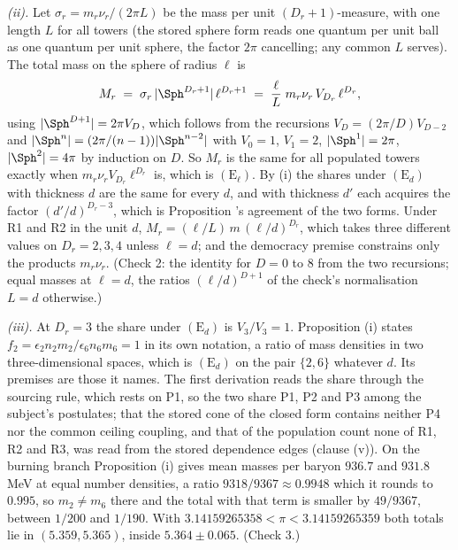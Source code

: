 \emph{(ii).} Let $\sigma_{r} = m_{r}\nu_{r}/(2\pi L)$ be the mass per unit $(D_{r}+1)$-measure, with one length $L$ for all towers (the stored sphere form reads one quantum per unit ball as one quantum per unit sphere, the factor $2\pi$ cancelling; any common $L$ serves). The total mass on the sphere of radius $\ell$ is
\[
M_{r} \;=\; \sigma_{r}\,|\Sph^{D_{r}+1}|\,\ell^{D_{r}+1} \;=\; \frac{\ell}{L}\; m_{r}\nu_{r}\,V_{D_{r}}\,\ell^{D_{r}},
\]
using $|\Sph^{D+1}| = 2\pi V_{D}$, which follows from the recursions $V_{D} = (2\pi/D)V_{D-2}$ and $|\Sph^{n}| = (2\pi/(n-1))|\Sph^{n-2}|$ with $V_{0} = 1$, $V_{1} = 2$, $|\Sph^{1}| = 2\pi$, $|\Sph^{2}| = 4\pi$ by induction on $D$. So $M_{r}$ is the same for all populated towers exactly when $m_{r}\nu_{r}V_{D_{r}}\ell^{D_{r}}$ is, which is $(\mathrm{E}_{\ell})$. By (i) the shares under $(\mathrm{E}_{d})$ with thickness $d$ are the same for every $d$, and with thickness $d'$ each acquires the factor $(d'/d)^{D_{r}-3}$, which is Proposition 's agreement of the two forms. Under R1 and R2 in the unit $d$, $M_{r} = (\ell/L)\,m\,(\ell/d)^{D_{r}}$, which takes three different values on $D_{r} = 2, 3, 4$ unless $\ell = d$; and the democracy premise constrains only the products $m_{r}\nu_{r}$. (Check 2: the identity for $D = 0$ to $8$ from the two recursions; equal masses at $\ell = d$, the ratios $(\ell/d)^{D+1}$ of the check's normalisation $L = d$ otherwise.)

\emph{(iii).} At $D_{r} = 3$ the share under $(\mathrm{E}_{d})$ is $V_{3}/V_{3} = 1$. Proposition (i) states $f_{2} = \epsilon_{2}n_{2}m_{2}/\epsilon_{6}n_{6}m_{6} = 1$ in its own notation, a ratio of mass densities in two three-dimensional spaces, which is $(\mathrm{E}_{d})$ on the pair $\{2, 6\}$ whatever $d$. Its premises are those it names. The first derivation reads the share through the sourcing rule, which rests on P1, so the two share P1, P2 and P3 among the subject's postulates; that the stored cone of the closed form contains neither P4 nor the common ceiling coupling, and that of the population count none of R1, R2 and R3, was read from the stored dependence edges (clause (v)). On the burning branch Proposition (i) gives mean masses per baryon $936.7$ and $931.8$ MeV at equal number densities, a ratio $9318/9367 \approx 0.9948$ which it rounds to $0.995$, so $m_{2} \neq m_{6}$ there and the total with that term is smaller by $49/9367$, between $1/200$ and $1/190$. With $3.14159265358 < \pi < 3.14159265359$ both totals lie in $(5.359, 5.365)$, inside $5.364 \pm 0.065$. (Check 3.)

